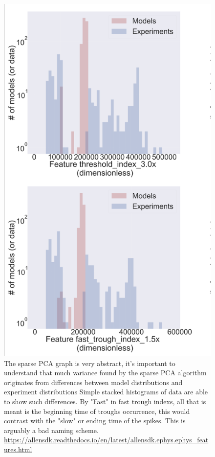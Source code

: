 \begin{figure}
    \centering
    \includegraphics[scale=0.75]{figures/features_that_disagree}
    \caption[Features that disagree. Slow Trough indexs, from the Allen cell types feature extraction]{The sparse PCA graph is very abstract, it's important to understand that much variance found by the sparse PCA algorithm originates from differences between model distributions and experiment distributions Simple stacked histograms of data are able to show such differences. By "Fast" in fast trough indexs, all that is meant is the beginning time of troughs occurrence, this would contrast with the "slow" or ending time of the spikes. This is arguably a bad naming scheme.
    \url{https://allensdk.readthedocs.io/en/latest/allensdk.ephys.ephys_features.html}
    }
    \label{fig:from_poster_disagree}
\end{figure}


